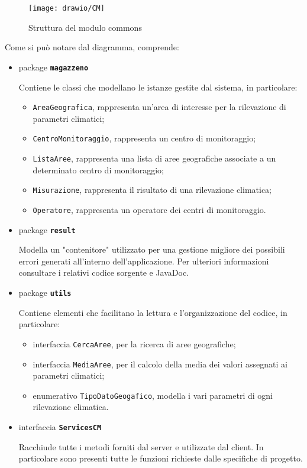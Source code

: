 \begin{figure}[h]
	\centering
	\caption{Struttura del modulo commons}
	\label{fig:commonscm}
	\texttt{[image: drawio/CM]}
\end{figure}
\pagebreak
Come si può notare dal diagramma, comprende:
\begin{itemize}
	\item package \textbf{\texttt{magazzeno}}
		
		Contiene le classi che modellano le istanze gestite dal sistema, in particolare:
		\begin{itemize}
			\item \texttt{AreaGeografica}, rappresenta un'area di interesse per la rilevazione di parametri climatici;
			\item \texttt{CentroMonitoraggio}, rappresenta un centro di monitoraggio;
			\item \texttt{ListaAree}, rappresenta una lista di aree geografiche associate a un determinato centro di monitoraggio;
			\item \texttt{Misurazione}, rappresenta il risultato di una rilevazione climatica;
			\item \texttt{Operatore}, rappresenta un operatore dei centri di monitoraggio.
		\end{itemize}
	\item package \textbf{\texttt{result}}
		
		Modella un "contenitore" utilizzato per una gestione migliore dei possibili errori generati all'interno dell'applicazione.
		Per ulteriori informazioni consultare i relativi codice sorgente e JavaDoc.
	\item package \textbf{\texttt{utils}}
		
		Contiene elementi che facilitano la lettura e l'organizzazione del codice, in particolare:
		\begin{itemize}
			\item interfaccia \texttt{CercaAree}, per la ricerca di aree geografiche;
			\item interfaccia \texttt{MediaAree}, per il calcolo della media dei valori assegnati ai parametri climatici;
			\item enumerativo \texttt{TipoDatoGeogafico}, modella i vari parametri di ogni rilevazione climatica.
		\end{itemize}
	\item interfaccia \textbf{\texttt{ServicesCM}}
	
		Racchiude tutte i metodi forniti dal server e utilizzate dal client. In particolare sono presenti tutte le funzioni richieste dalle specifiche di progetto.
\end{itemize}

\nocite{IuriTex}


